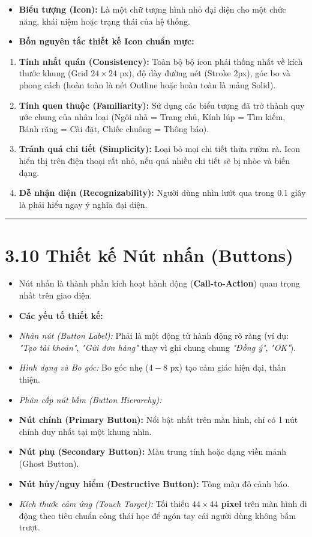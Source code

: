 \documentclass[11pt,a4paper,oneside]{report}
\begin{document}
\begin{itemize}[leftmargin=1.5em]
\item \textbf{Biểu tượng (Icon):} Là một chữ tượng hình nhỏ đại diện cho một chức năng, khái niệm hoặc trạng thái của hệ thống.
\item \textbf{Bốn nguyên tắc thiết kế Icon chuẩn mực:}
\end{itemize}
\begin{enumerate}[leftmargin=1.5em]
\item \textbf{Tính nhất quán (Consistency):} Toàn bộ bộ icon phải thống nhất về kích thước khung (Grid $24 \times 24$ px), độ dày đường nét (Stroke 2px), góc bo và phong cách (hoàn toàn là nét Outline hoặc hoàn toàn là mảng Solid).
\item \textbf{Tính quen thuộc (Familiarity):} Sử dụng các biểu tượng đã trở thành quy ước chung của nhân loại (Ngôi nhà = Trang chủ, Kính lúp = Tìm kiếm, Bánh răng = Cài đặt, Chiếc chuông = Thông báo).
\item \textbf{Tránh quá chi tiết (Simplicity):} Loại bỏ mọi chi tiết thừa rườm rà. Icon hiển thị trên điện thoại rất nhỏ, nếu quá nhiều chi tiết sẽ bị nhòe và biến dạng.
\item \textbf{Dễ nhận diện (Recognizability):} Người dùng nhìn lướt qua trong 0.1 giây là phải hiểu ngay ý nghĩa đại diện.
\end{enumerate}

\bigskip\hrule\bigskip

\section{3.10 Thiết kế Nút nhấn (Buttons)}

\begin{itemize}[leftmargin=1.5em]
\item Nút nhấn là thành phần kích hoạt hành động (\textbf{Call-to-Action}) quan trọng nhất trên giao diện.
\item \textbf{Các yếu tố thiết kế:}
\item \textit{Nhãn nút (Button Label):} Phải là một động từ hành động rõ ràng (ví dụ: \textit{"Tạo tài khoản"}, \textit{"Gửi đơn hàng"} thay vì ghi chung chung \textit{"Đồng ý"}, \textit{"OK"}).
\item \textit{Hình dạng và Bo góc:} Bo góc nhẹ ($4 - 8$ px) tạo cảm giác hiện đại, thân thiện.
\item \textit{Phân cấp nút bấm (Button Hierarchy):}
\item \textbf{Nút chính (Primary Button):} Nổi bật nhất trên màn hình, chỉ có 1 nút chính duy nhất tại một khung nhìn.
\item \textbf{Nút phụ (Secondary Button):} Màu trung tính hoặc dạng viền mảnh (Ghost Button).
\item \textbf{Nút hủy/nguy hiểm (Destructive Button):} Tông màu đỏ cảnh báo.
\item \textit{Kích thước cảm ứng (Touch Target):} Tối thiểu \textbf{$44 \times 44$ pixel} trên màn hình di động theo tiêu chuẩn công thái học để ngón tay cái người dùng không bấm trượt.
\end{itemize}
\end{document}
